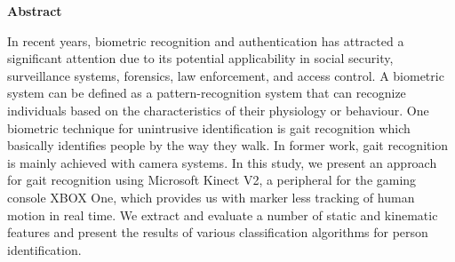 \begin{center}
\begin{huge}
\bfseries{Abstract}
\end{huge}
\end{center}
\noindent In recent years, biometric recognition and authentication has attracted a significant attention due to its potential applicability in social security, surveillance systems, forensics, law enforcement, and access control. A biometric system can be defined as a pattern-recognition system that can recognize individuals based on the characteristics of their physiology or behaviour. One biometric technique for unintrusive identification is gait recognition which basically identifies people by the way they walk. In former work, gait recognition is mainly achieved with camera systems. In this study, we present an approach for gait recognition using Microsoft Kinect V2, a peripheral for the gaming console XBOX One, which provides us with marker less tracking of human motion in real time. We extract and evaluate a number of static and kinematic features and present the results of various classification algorithms for person identification.
\pagebreak
